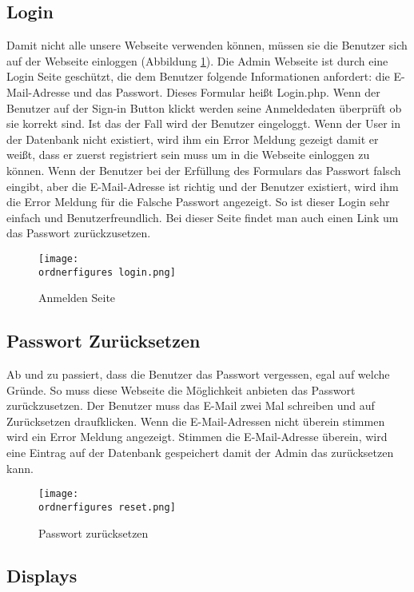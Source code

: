 \subsection{Login}
Damit nicht alle unsere Webseite verwenden können, müssen sie die Benutzer sich auf der Webseite einloggen (Abbildung \ref{fi:login}). Die Admin Webseite ist durch eine Login Seite geschützt, die dem Benutzer folgende Informationen anfordert: die E-Mail-Adresse und das Passwort. Dieses Formular heißt Login.php. Wenn der Benutzer auf der Sign-in Button klickt werden seine Anmeldedaten überprüft ob sie korrekt sind. Ist das der Fall wird der Benutzer eingeloggt. Wenn der User in der Datenbank nicht existiert, wird ihm ein Error Meldung gezeigt damit er weißt, dass er zuerst registriert sein muss um in die Webseite einloggen zu können. Wenn der Benutzer bei der Erfüllung des Formulars das Passwort falsch eingibt, aber die E-Mail-Adresse ist richtig und der Benutzer existiert, wird ihm die Error Meldung für die Falsche Passwort angezeigt. So ist dieser Login sehr einfach und Benutzerfreundlich. Bei dieser Seite findet man auch einen Link um das Passwort zurückzusetzen.

\begin{figure}[H]
	\centering
	\texttt{[image: \\ordnerfigures login.png]}
	\caption{Anmelden Seite}
	\label{fi:login}
\end{figure}

\subsection{Passwort Zurücksetzen}
Ab und zu passiert, dass die Benutzer das Passwort vergessen, egal auf welche Gründe. So muss diese Webseite die Möglichkeit anbieten das Passwort zurückzusetzen. Der Benutzer muss das E-Mail zwei Mal schreiben und auf Zurücksetzen draufklicken. Wenn die E-Mail-Adressen nicht überein stimmen wird ein Error Meldung angezeigt. Stimmen die E-Mail-Adresse überein, wird eine Eintrag auf der Datenbank gespeichert damit der Admin das zurücksetzen kann.
\begin{figure}[H]
	\centering
	\texttt{[image: \\ordnerfigures reset.png]}
	\caption{Passwort zurücksetzen}
	\label{fi:reset}
\end{figure}

\subsection{Displays}



